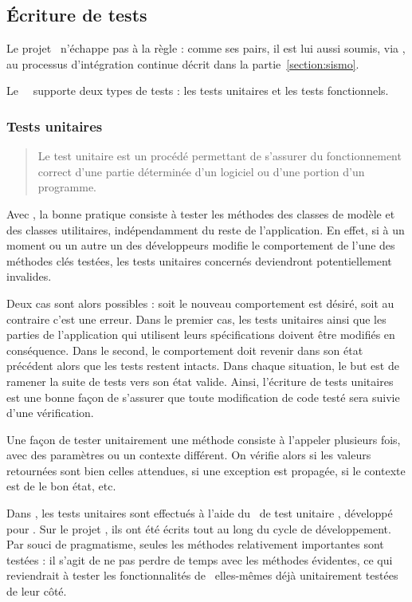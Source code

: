\subsection{Écriture de tests}

Le projet \aey\ n'échappe pas à la règle : comme ses pairs, il est lui aussi soumis, via \asismo, au processus d'intégration continue décrit dans la partie~\ref{section:sismo}.

Le \afm\ \asf\ supporte deux types de tests : les tests unitaires et les tests fonctionnels.


\subsubsection{Tests unitaires}

\begin{quote}
Le test unitaire est un procédé permettant de s'assurer du fonctionnement correct d'une partie déterminée d'un logiciel ou d'une portion d'un programme.\cite{unit}
\end{quote}

Avec \asf, la bonne pratique consiste à tester les méthodes des classes de modèle et des classes utilitaires, indépendamment du reste de l'application. En effet, si à un moment ou un autre un des développeurs modifie le comportement de l'une des méthodes clés testées, les tests unitaires concernés deviendront potentiellement invalides.

Deux cas sont alors possibles : soit le nouveau comportement est désiré, soit au contraire c'est une erreur. Dans le premier cas, les tests unitaires ainsi que les parties de l'application qui utilisent leurs spécifications doivent être modifiés en conséquence. Dans le second, le comportement doit revenir dans son état précédent alors que les tests restent intacts. Dans chaque situation, le but est de ramener la suite de tests vers son état valide. Ainsi, l'écriture de tests unitaires est une bonne façon de s'assurer que toute modification de code testé sera suivie d'une vérification.

Une façon de tester unitairement une méthode consiste à l'appeler plusieurs fois, avec des paramètres ou un contexte différent. On vérifie alors si les valeurs retournées sont bien celles attendues, si une exception est propagée, si le contexte est de le bon état, etc.

Dans \asf, les tests unitaires sont effectués à l'aide du \afm\ de test unitaire \alime, développé pour \asf. Sur le projet \aey, ils ont été écrits tout au long du cycle de développement. Par souci de pragmatisme, seules les méthodes relativement importantes sont testées : il s'agit de ne pas perdre de temps avec les méthodes évidentes, ce qui reviendrait à tester les fonctionnalités de \asf\ elles-mêmes déjà unitairement testées de leur côté.

